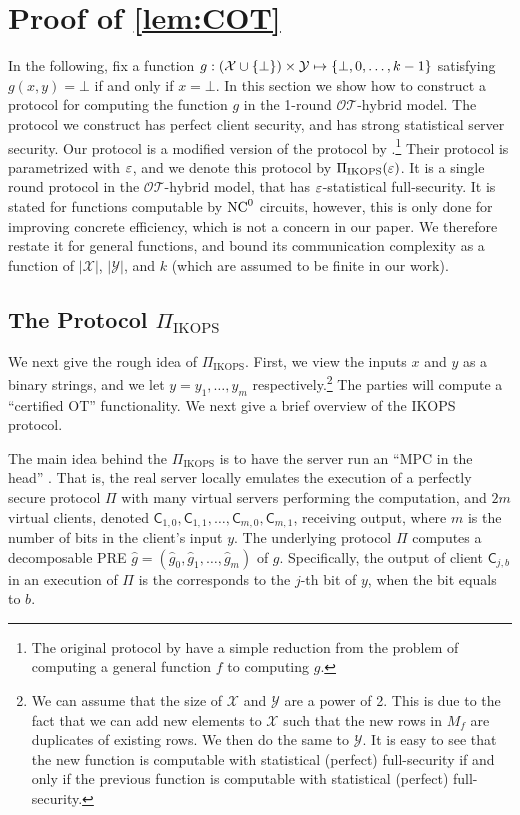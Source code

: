 \documentclass{llncs}
\newcommand{\OTfunc}{\mathcal{OT}}
\newcommand{\OThybrid}{\OTfunc\mbox{-}\text{hybrid}}
\newcommand{\X}{\mathcal{X}}
\newcommand{\Y}{\mathcal{Y}}
\newcommand{\IKOPS}{\operatorname{IKOPS}}
\newcommand{\Cc}{\mathsf{C}}
\begin{document}
\section{Proof of \texorpdfstring{\cref{lem:COT}}{Lemma 3}}\label{sec:IKOPS}
In the following, fix a function $g:(\X\cup\set{\bot})\times\Y\mapsto\set{\bot,0,\ldots,k-1}$ satisfying $g(x,y)=\bot$ if and only if $x=\bot$. In this section we show how to construct a protocol for computing the function $g$ in the 1-round $\OThybrid$ model. The protocol we construct has perfect client security, and has strong statistical server security. Our protocol is a modified version of the protocol by \citet{IKOPS11}.\footnote{The original protocol by \cite{IKOPS11} have a simple reduction from the problem of computing a general function $f$ to computing $g$.} Their protocol is parametrized with $\varepsilon$, and we denote this protocol by $\Pi_{\IKOPS}(\eps)$. It is a single round protocol in the $\OThybrid$ model, that has $\varepsilon$-statistical full-security. It is stated for functions computable by $\mathrm{NC}^0$ circuits, however, this is only done for improving concrete efficiency, which is not a concern in our paper. We therefore restate it for general functions, and bound its communication complexity as a function of $|\X|$, $|\Y|$, and $k$ (which are assumed to be finite in our work). 

\subsection{\texorpdfstring{The Protocol $\Pi_{\IKOPS}$}{The IKOPS Protocol}}
We next give the rough idea of $\Pi_{\IKOPS}$. First, we view the inputs $x$ and $y$ as a binary strings, and we let  $y=y_1,\ldots,y_m$ respectively.\footnote{We can assume \wlg that the size of $\X$ and $\Y$ are a power of 2. This is due to the fact that we can add new elements to $\X$ such that the new rows in $M_f$ are duplicates of existing rows. We then do the same to $\Y$. It is easy to see that the new function is computable with statistical (perfect) full-security if and only if the previous function is computable with statistical (perfect) full-security.} The parties will compute a ``certified OT'' functionality. We next give a brief overview of the IKOPS protocol. 

The main idea behind the $\Pi_{\IKOPS}$ is to have the server run an ``MPC in the head'' \cite{IPS08}. That is, the real server locally emulates the execution of a perfectly secure protocol $\Pi$ with many virtual servers performing the computation, and $2m$ virtual clients, denoted $\Cc_{1,0},\Cc_{1,1},\ldots,\Cc_{m,0},\Cc_{m,1}$, receiving output, where $m$ is the number of bits in the client's input $y$. The underlying protocol $\Pi$  computes a decomposable PRE $\hat{g} = (\hat{g}_0,\hat{g}_1,\ldots,\hat{g}_m)$ of $g$. Specifically, the output of client $\Cc_{j,b}$ in an execution of $\Pi$ is the  corresponds to the $j$-th bit of $y$, when the bit equals to $b$. 
\end{document}
